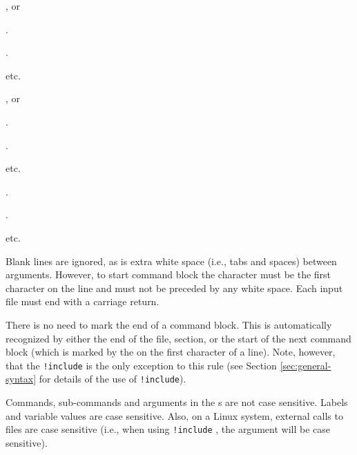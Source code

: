 \begin{multicols}{3}
	\begin{description}
		\item {}, or
		\item {} 
		\item {} 
		\item .
		\item .
		\item etc.
		\item {} , or
		\item {} 
		\item {} 
		\item .
		\item .
		\item etc.
		\item {} 
		\item {} 
		\item {} 
		\item .
		\item .
		\item etc.
		\end{description}
	\end{multicols}

Blank lines are ignored, as is extra white space (i.e., tabs and spaces) between arguments. However, to start command block the \command{} character must be the first character on the line and must not be preceded by any white space. Each input file must end with a carriage return.

There is no need to mark the end of a command block. This is automatically recognized by either the end of the file, section, or the start of the next command block (which is marked by the \command{} on the first character of a line). Note, however, that the \texttt{!include} is the only exception to this rule (see Section \ref{sec:general-syntax} for details of the use of \texttt{!include}). 

Commands, sub-commands and arguments in the \config s are not case sensitive. Labels and variable values are case sensitive. Also, on a Linux system, external calls to files are case sensitive (i.e., when using \texttt{!include} , the argument  will be case sensitive). 


